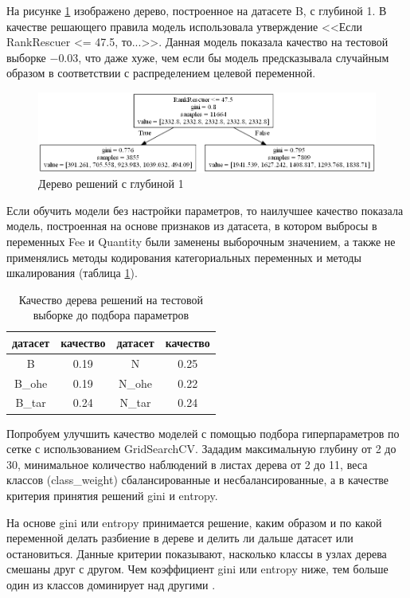 \documentclass[14pt]{mmcs_article}
\begin{document}
На рисунке \ref{models:tree} изображено дерево, построенное на датасете B, с глубиной 1. В качестве решающего правила модель использовала утверждение <<Если RankRescuer <= 47.5, то...>>. Данная модель показала качество на тестовой выборке $-0.03$, что даже хуже, чем если бы модель предсказывала случайным образом в соответствии с распределением целевой переменной.

\begin{figure}[H]
	\centering
	\includegraphics[scale=0.67]{tree.png}
	\caption{Дерево решений с глубиной 1}\label{models:tree}
\end{figure}

Если обучить модели без настройки параметров, то наилучшее качество показала модель, построенная на основе признаков из датасета, в котором выбросы в переменных Fee и Quantity были заменены выборочным значением, а также не применялись методы кодирования категориальных переменных и методы шкалирования (таблица \ref{models:table1}).

\begin{table}[H]
	\centering
	\caption{Качество дерева решений на тестовой выборке до подбора параметров}\label{models:table1}
	\begin{tabular}{cccc}
		\hline
		датасет & качество	& датасет & качество \\
		\hline
		B &	0.19 &	N &	0.25\\
		B\_ohe &	0.19 &	N\_ohe &	0.22\\
		B\_tar &	0.24 &	N\_tar &	0.24\\
		\hline
	\end{tabular}
\end{table}

Попробуем улучшить качество моделей с помощью подбора гиперпараметров по сетке с использованием GridSearchCV. Зададим максимальную глубину от 2 до 30, минимальное количество наблюдений в листах дерева от 2 до 11, веса классов (class\_weight) сбалансированные и несбалансированные, а в качестве критерия принятия решений gini и entropy.

На основе gini или entropy принимается решение, каким образом и по какой переменной делать разбиение в дереве и делить ли дальше датасет или остановиться. Данные критерии показывают, насколько классы в узлах дерева смешаны друг с другом. Чем коэффициент gini или entropy ниже, тем больше один из классов доминирует над другими \cite{lib:ginientropy}.
\end{document}
